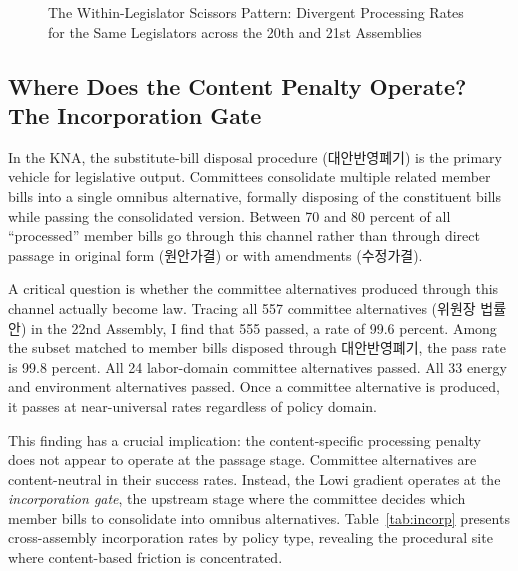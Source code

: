 \documentclass[11pt]{article}
\begin{document}
\begin{figure}[H]
\centering
{}
\caption{The Within-Legislator Scissors Pattern: Divergent Processing Rates for the Same Legislators across the 20th and 21st Assemblies}
\label{fig:scissors}
\end{figure}

\subsection{Where Does the Content Penalty Operate? The Incorporation Gate}
\label{sec:results-mechanism}

In the KNA, the substitute-bill disposal procedure (대안반영폐기) is the primary vehicle for legislative output. Committees consolidate multiple related member bills into a single omnibus alternative, formally disposing of the constituent bills while passing the consolidated version. Between 70 and 80 percent of all ``processed'' member bills go through this channel rather than through direct passage in original form (원안가결) or with amendments (수정가결).

A critical question is whether the committee alternatives produced through this channel actually become law. Tracing all 557 committee alternatives (위원장 법률안) in the 22nd Assembly, I find that 555 passed, a rate of 99.6 percent. Among the subset matched to member bills disposed through 대안반영폐기, the pass rate is 99.8 percent. All 24 labor-domain committee alternatives passed. All 33 energy and environment alternatives passed. Once a committee alternative is produced, it passes at near-universal rates regardless of policy domain.

This finding has a crucial implication: the content-specific processing penalty does not appear to operate at the passage stage. Committee alternatives are content-neutral in their success rates. Instead, the Lowi gradient operates at the \emph{incorporation gate}, the upstream stage where the committee decides which member bills to consolidate into omnibus alternatives. Table~\ref{tab:incorp} presents cross-assembly incorporation rates by policy type, revealing the procedural site where content-based friction is concentrated.
\end{document}
